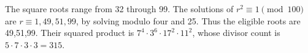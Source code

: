 The square roots range from 32 through 99. The solutions of $r^2\equiv1\pmod{100}$ are $r\equiv1,49,51,99$, by solving modulo four and 25. Thus the eligible roots are 49,51,99. Their squared product is $7^4\cdot3^6\cdot17^2\cdot11^2$, whose divisor count is $5\cdot7\cdot3\cdot3=\boxed{315}$.
